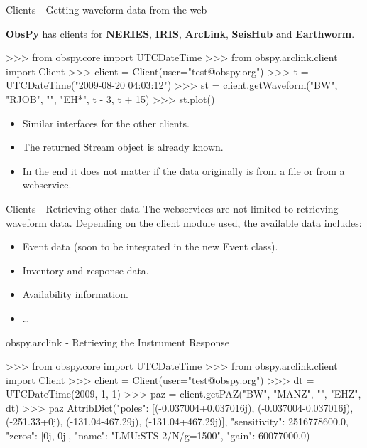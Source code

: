 \begin{frame}{Clients - Getting waveform data from the web}

\textbf{ObsPy} has clients for \textbf{NERIES}, \textbf{IRIS}, \textbf{ArcLink}, \textbf{SeisHub} and \textbf{Earthworm}.

\begin{myColorBox}{0.95}{}

\begin{python}
>>> from obspy.core import UTCDateTime
>>> from obspy.arclink.client import Client
>>> client = Client(user="test@obspy.org")
>>> t = UTCDateTime("2009-08-20 04:03:12")
>>> st = client.getWaveform("BW", "RJOB", "", "EH*",
        t - 3, t + 15)
>>> st.plot()
\end{python}

\end{myColorBox}

\begin{itemize}
    \item Similar interfaces for the other clients.
    \item The returned Stream object is already known.
    \item In the end it does not matter if the data originally is from a file or from a webservice.
\end{itemize}

\end{frame}

\begin{frame}{Clients - Retrieving other data}
    The webservices are not limited to retrieving waveform data. Depending on the client module used, the available data includes:
    \vspace{2em}
    \begin{itemize}
        \item Event data (soon to be integrated in the new Event class).
        \item Inventory and response data.
        \item Availability information.
        \item \dots
    \end{itemize}
\end{frame}


\begin{frame}{obspy.arclink - Retrieving the Instrument Response}
\begin{myColorBox}{0.95}{}
\begin{python}
>>> from obspy.core import UTCDateTime
>>> from obspy.arclink.client import Client
>>> client = Client(user="test@obspy.org")
>>> dt = UTCDateTime(2009, 1, 1)
>>> paz = client.getPAZ("BW", "MANZ", "", "EHZ", dt)
>>> paz
AttribDict({"poles": [(-0.037004+0.037016j),
                (-0.037004-0.037016j), (-251.33+0j),
                (-131.04-467.29j), (-131.04+467.29j)],
            "sensitivity": 2516778600.0,
            "zeros": [0j, 0j],
            "name": "LMU:STS-2/N/g=1500",
            "gain": 60077000.0})
\end{python}
\end{myColorBox}
\end{frame}


